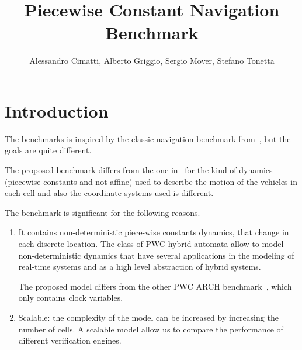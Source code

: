 \documentclass[11pt,twoside,a4paper]{article}
\begin{document}
\title{Piecewise Constant Navigation Benchmark}
\author{Alessandro Cimatti, Alberto Griggio, Sergio Mover, Stefano Tonetta}
\maketitle

\section{Introduction}

The benchmarks is inspired by the classic navigation benchmark
from~\cite{HSCC04}, but the goals are quite different.

The proposed benchmark differs from the one in~\cite{HSCC04} for the 
kind of dynamics (piecewise constants and not affine) used to
describe the motion of the vehicles in each cell and also the
coordinate systems used is different.

The benchmark is significant for the following reasons.
\begin{enumerate}
\item It contains non-deterministic piece-wise constants dynamics, that change in each discrete location.
%
The class of PWC hybrid automata allow to model non-deterministic
 dynamics that have several applications in the
modeling of real-time systems and as a high level abstraction of
hybrid systems.

The proposed model differs from the other PWC ARCH
benchmark~\cite{ttethernetarch}, which only contains clock variables.


\item Scalable: the complexity of the model can be increased by
  increasing the number of cells. A scalable model allow us to compare
  the performance of different verification engines.
\end{enumerate}
\end{document}
